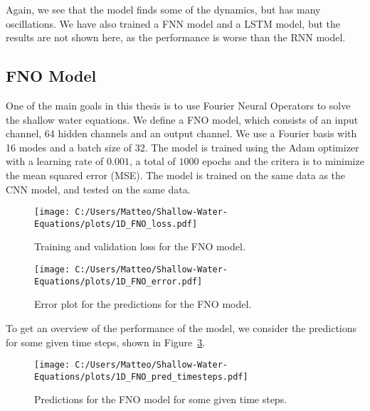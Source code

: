 Again, we see that the model finds some of the dynamics, but has many oscillations.
We have also trained a FNN model and a LSTM model, but the results are not shown here, as the performance is worse than the RNN model.

\subsection*{FNO Model}
One of the main goals in this thesis is to use Fourier Neural Operators to solve the shallow water equations.
We define a FNO model, which consists of an input channel, 64 hidden channels and an output channel. We use a Fourier basis with 16 modes and a batch size of 32.
The model is trained using the Adam optimizer with a learning rate of $0.001$, a total of $1000$ epochs and the critera is to minimize the mean squared error (MSE).
The model is trained on the same data as the CNN model, and tested on the same data.

\begin{figure}[H]
    \centering
    \texttt{[image: C:/Users/Matteo/Shallow-Water-Equations/plots/1D\_FNO\_loss.pdf]}
    \caption{Training and validation loss for the FNO model.}\label{fig:1D_FNO_loss}
\end{figure}

\begin{figure}[H]
    \centering
    \texttt{[image: C:/Users/Matteo/Shallow-Water-Equations/plots/1D\_FNO\_error.pdf]}
    \caption{Error plot for the predictions for the FNO model.}\label{fig:1D_FNO_error}
\end{figure}

To get an overview of the performance of the model, we consider the predictions for some given time steps, shown in Figure~\ref{fig:1D_FNO_pred_timesteps}.
\begin{figure}[H]
    \centering
    \texttt{[image: C:/Users/Matteo/Shallow-Water-Equations/plots/1D\_FNO\_pred\_timesteps.pdf]}
    \caption{Predictions for the FNO model for some given time steps.}\label{fig:1D_FNO_pred_timesteps}
\end{figure}



